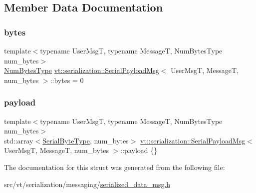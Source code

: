 \subsection{Member Data Documentation}
\mbox{\label{structvt_1_1serialization_1_1_serial_payload_msg_ac9022dd53be215aeca6b300f84834806}} 
\subsubsection{\texorpdfstring{bytes}{bytes}}
{\footnotesize\ttfamily template$<$typename User\+MsgT, typename MessageT, Num\+Bytes\+Type num\+\_\+bytes$>$ \\
\hyperlink{namespacevt_1_1serialization_aaa03b9b407ed5776043c163629312e40}{Num\+Bytes\+Type} \hyperlink{structvt_1_1serialization_1_1_serial_payload_msg}{vt\+::serialization\+::\+Serial\+Payload\+Msg}$<$ User\+MsgT, MessageT, num\+\_\+bytes $>$\+::bytes = 0}

\mbox{\label{structvt_1_1serialization_1_1_serial_payload_msg_ab71d301de848ba00a812bfaf3a0cc44e}} 
\subsubsection{\texorpdfstring{payload}{payload}}
{\footnotesize\ttfamily template$<$typename User\+MsgT, typename MessageT, Num\+Bytes\+Type num\+\_\+bytes$>$ \\
std\+::array$<$\hyperlink{namespacevt_1_1serialization_a74f8d1a55940f9c38fc29522de66d926}{Serial\+Byte\+Type}, num\+\_\+bytes$>$ \hyperlink{structvt_1_1serialization_1_1_serial_payload_msg}{vt\+::serialization\+::\+Serial\+Payload\+Msg}$<$ User\+MsgT, MessageT, num\+\_\+bytes $>$\+::payload \{\}}



The documentation for this struct was generated from the following file\+:\begin{DoxyCompactItemize}
\item 
src/vt/serialization/messaging/\hyperlink{serialized__data__msg_8h}{serialized\+\_\+data\+\_\+msg.\+h}\end{DoxyCompactItemize}
